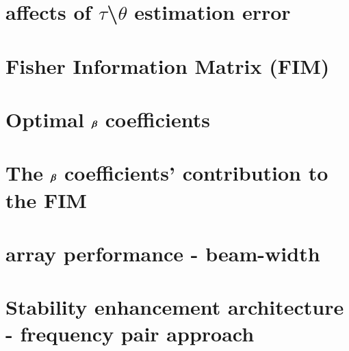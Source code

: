
\def\showDev{}

\begin{appendices}

\chapter{affects of $ \tau $\textbackslash$ \theta $ estimation error}
\label{apdx:MathDerv}


\chapter{Fisher Information Matrix (FIM)}
\label{apdx:clacFim_chapter}


\chapter{Optimal $\boldsymbol{\beta}$ coefficients}


\chapter{The $\boldsymbol{\beta}$ coefficients' contribution to the FIM}
\label{apdx:deltaFIM}


\chapter{array performance - beam-width}
\label{apdx:arrayPerformance_beamwidth}


\chapter{Stability enhancement architecture - frequency pair approach}
\label{apdx:stabilityEnhancement_freqPairApproach}


\end{appendices}


